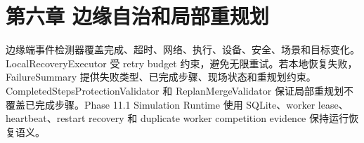 \chapter{第六章 边缘自治和局部重规划}

边缘端事件检测器覆盖完成、超时、网络、执行、设备、安全、场景和目标变化。LocalRecoveryExecutor 受 retry budget 约束，避免无限重试。若本地恢复失败，FailureSummary 提供失败类型、已完成步骤、现场状态和重规划约束。CompletedStepsProtectionValidator 和 ReplanMergeValidator 保证局部重规划不覆盖已完成步骤。Phase 11.1 Simulation Runtime 使用 SQLite、worker lease、heartbeat、restart recovery 和 duplicate worker competition evidence 保持运行恢复语义。\par
